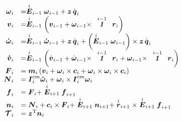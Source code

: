 \documentclass[10pt,a4paper]{book}
\theoremstyle{thmstyle} %
\theoremstyle{defstyle} %
\theoremstyle{prostyle} %
\begin{document}
$$
\begin{array}{rl} { \boldsymbol{ \omega } _ { i } } & { = \stackrel { i } { \boldsymbol{ E } } _ { i - 1 } \boldsymbol{ \omega } _ { i - 1 } + \boldsymbol { z } \, \dot { \boldsymbol{ q } } _ { i } } \\{ \boldsymbol{ v } _ { i } } & { = \stackrel { i } { \boldsymbol{ E } } _ { i - 1 } \left( \boldsymbol{ v } _ { i - 1 } + \boldsymbol{ \omega } _ { i - 1 } \times \stackrel { i - 1 } { \mathrm { \textbf { \textit { 1 } } } } \boldsymbol{ r } _ { i } \right) } \\{ \boldsymbol{ \dot { \omega } } _ { i } } & { = \stackrel { i } { \boldsymbol{ E } } _ { i - 1 } \boldsymbol{ \dot { \omega } } _ { i - 1 } + \boldsymbol { z } \, \ddot { \boldsymbol{ q } } _ { i } + \left( \stackrel { i } { \boldsymbol{ E } } _ { i - 1 } \boldsymbol{ \omega } _ { i - 1 } \right) \times \boldsymbol { z } \, \dot { \boldsymbol{ q } } _ { i } } \\{ \boldsymbol{ \dot { v } } _ { i } } & { = \stackrel { i } { \boldsymbol{ E } } _ { i - 1 } \left( \dot { \boldsymbol{ v } } _ { i - 1 } + \dot { \boldsymbol{ \omega } } _ { i - 1 } \times \stackrel { i - 1 } { \mathrm { \textbf { \textit { 1 } } } } \boldsymbol{ r } _ { i } + \boldsymbol { \omega } _ { i - 1 } \times \stackrel { i - 1 } { \mathrm { \textbf { \textit { 1 } } } } \boldsymbol{ r } _ { i } \right) } \\{ \boldsymbol{ F } _ { i } } & { = \boldsymbol { m } _ { i } \left( \boldsymbol{ v } _ { i } + \boldsymbol{ \omega } _ { i } \times \boldsymbol{ c } _ { i } + \boldsymbol { \omega } _ { i } \times \boldsymbol{ \omega } _ { i } \times \boldsymbol{ c } _ { i } \right) } \\{ \boldsymbol{ N } _ { i } } & { = \boldsymbol{ I } _ { i } ^{c m} \boldsymbol{ \dot { \omega } } _ { i } + \boldsymbol{ \omega } _ { i } \times \boldsymbol{ I } _ { i } ^{c m} \boldsymbol{ \omega } _ { i } } \\{ \boldsymbol{ f } _ { i } } & { = \boldsymbol{ F } _ { i } + \stackrel { i } { \boldsymbol{ E } } _ { i + 1 } \boldsymbol{ f } _ { i + 1 } } \\{ \boldsymbol{ n } _ { i } } & { = \boldsymbol{ N } _ { i } + \boldsymbol{ c } _ { i } \times \boldsymbol{ F } _ { i } + \stackrel { i } { \boldsymbol{ E } } _ { i + 1 } \boldsymbol{ n } _ { i + 1 } + \stackrel { i } { \boldsymbol{ r } } _ { i + 1 } \times \stackrel { i } { \boldsymbol{ E } } _ { i + 1 } \boldsymbol{ f } _ { i + 1 } } \\{ \boldsymbol{ \mathcal { T } } _ { i } } & { = \boldsymbol { z } ^{\mathrm { T} } \boldsymbol{ n } _ { i } } \end{array}
$$
\end{document}
